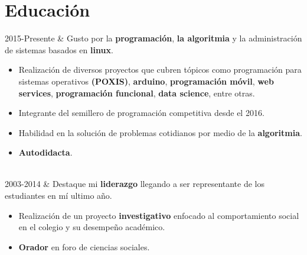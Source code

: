 \documentclass[
    changecolor={111, 156, 45}, 
]{cv-roald}
\newcommand{\RomanNumeralCaps}[1]
    {\MakeUppercase{\romannumeral #1}}
\begin{document}
\section*{Educación}
\begin{tabularcv}

2015-Presente   &   
                \newline Gusto por la  \textbf{programación}, \textbf{la algoritmia} y la administración de sistemas basados en \textbf{linux}.
                \begin{itemize}
				  \item Realización de diversos proyectos que cubren tópicos como programación para sistemas operativos \textbf{(POXIS)}, \textbf{arduino}, \textbf{programación móvil}, \textbf{web services}, \textbf{programación funcional}, \textbf{data science}, entre otras.
				  \item Integrante del semillero de programación competitiva desde el 2016.
				  \item  Habilidad en la solución de problemas cotidianos por medio de la \textbf{algoritmia}.
				  \item \textbf{Autodidacta}.
                \end{itemize}
                \\
                
2003-2014   &     
                \newline Destaque mi \textbf{liderazgo} llegando a ser representante de los estudiantes en mí ultimo año. 
                \begin{itemize}
				  \item Realización de un proyecto \textbf{investigativo} enfocado al comportamiento social en el colegio y su desempeño académico.
                  \item \textbf{Orador} en \RomanNumeralCaps{2} foro de ciencias sociales.
                \end{itemize} 

                
\end{tabularcv}
\end{document}
